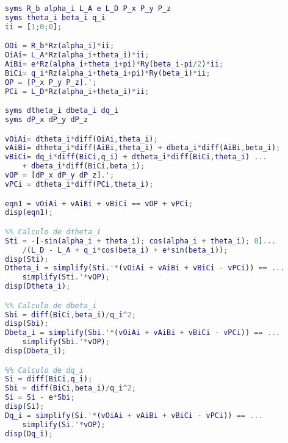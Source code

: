 
\begin{lstlisting}[frame=single,language = matlab]
syms R_b alpha_i L_A e L_D P_x P_y P_z
syms theta_i beta_i q_i
ii = [1;0;0];

OOi = R_b*Rz(alpha_i)*ii;
OiAi= L_A*Rz(alpha_i+theta_i)*ii;
AiBi= e*Rz(alpha_i+theta_i+pi)*Ry(beta_i-pi/2)*ii;
BiCi= q_i*Rz(alpha_i+theta_i+pi)*Ry(beta_i)*ii;
OP = [P_x P_y P_z].';
PCi = L_D*Rz(alpha_i+theta_i)*ii;

syms dtheta_i dbeta_i dq_i
syms dP_x dP_y dP_z

vOiAi= dtheta_i*diff(OiAi,theta_i);
vAiBi= dtheta_i*diff(AiBi,theta_i) + dbeta_i*diff(AiBi,beta_i);
vBiCi= dq_i*diff(BiCi,q_i) + dtheta_i*diff(BiCi,theta_i) ...
    + dbeta_i*diff(BiCi,beta_i);
vOP = [dP_x dP_y dP_z].';
vPCi = dtheta_i*diff(PCi,theta_i);

eqn1 = vOiAi + vAiBi + vBiCi == vOP + vPCi;
disp(eqn1);

%% Calculo de dtheta_i
Sti = -[-sin(alpha_i + theta_i); cos(alpha_i + theta_i); 0]...
    /(L_D - L_A + q_i*cos(beta_i) + e*sin(beta_i));
disp(Sti);
Dtheta_i = simplify(Sti.'*(vOiAi + vAiBi + vBiCi - vPCi)) == ...
    simplify(Sti.'*vOP);
disp(Dtheta_i);

%% Calculo de dbeta_i
Sbi = diff(BiCi,beta_i)/q_i^2;
disp(Sbi);
Dbeta_i = simplify(Sbi.'*(vOiAi + vAiBi + vBiCi - vPCi)) == ...
    simplify(Sbi.'*vOP);
disp(Dbeta_i);

%% Calculo de dq_i
Si = diff(BiCi,q_i);
Sbi = diff(BiCi,beta_i)/q_i^2;
Si = Si - e*Sbi;
disp(Si);
Dq_i = simplify(Si.'*(vOiAi + vAiBi + vBiCi - vPCi)) == ...
    simplify(Si.'*vOP);
disp(Dq_i);
\end{lstlisting}